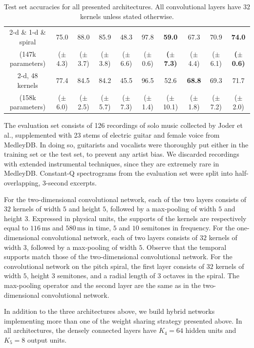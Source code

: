 \documentclass{article}
\makeatletter
\newcommand*{\etal}{et al.\@\xspace}
\newcommand*{\s}[1]{\small{($\pm$ #1)}}
\newcommand*{\g}[1]{\small{\textbf{(}$\boldsymbol{\pm}$ \textbf{#1}\textbf{)}}}
\makeatother
\begin{document}
\begin{table}[t]
\begin{center}
\begin{tabular}{|c|cccccccc|c|}
        \hline
        2-d \& 1-d \& spiral
        & 75.0 & 88.0 & 85.9 & 48.3 & 97.8 & \textbf{59.0} & 67.3 & 70.9 & \textbf{74.0}  \\
        (147k parameters)
        &\s{4.3}&\s{3.7}&\s{3.8}&\s{6.6}&\s{0.6}&\g{7.3}&\s{4.4}&\s{6.1}&\g{0.6}\\
        \hline
        2-d, 48 kernels
        & 77.4 & 84.5 & 84.2 & 45.5 & 96.5 & 52.6 & \textbf{68.8} & 69.3 & 71.7\\
        (158k parameters)
        &\s{6.0}&\s{2.5}&\s{5.7}&\s{7.3}&\s{1.4}&\s{10.1}&\s{1.8}&\s{7.2}&\s{2.0}\\
        \hline
    \end{tabular}
    \end{center}
    \caption{Test set accuracies for all presented architectures. All convolutional layers
    have $32$ kernels unless stated otherwise.
    \label{table:results}}
\end{table}


The evaluation set consists of 126 recordings of solo music collected by
Joder \etal \cite{Joder2009}, supplemented with
23 stems of electric guitar and female voice from MedleyDB.
In doing so, guitarists and vocalists were thoroughly put either in the training set or the test set,
to prevent any artist bias.
We discarded recordings with extended instrumental techniques, since they are
extremely rare in MedleyDB.
Constant-Q spectrograms from the evaluation set were split into half-overlapping,
3-second excerpts.

For the two-dimensional convolutional network, each of the two layers consists of
$32$ kernels of width $5$ and height $5$, followed by a max-pooling of width $5$
and height $3$. Expressed in physical units, the supports of the kernels are respectively equal to $116\,\mathrm{ms}$ and $580\,\mathrm{ms}$ in time, $5$ and $10$ semitones in frequency.
For the one-dimensional convolutional network, each of two layers consists of
$32$ kernels of width $3$, followed by a max-pooling of width $5$. Observe that the temporal
supports match those of the two-dimensional convolutional network.
For the convolutional network on the pitch spiral, the first layer consists of $32$ kernels
of width $5$, height $3$ semitones, and a radial length of $3$ octaves in the spiral.
The max-pooling operator and the second layer are the same as in the two-dimensional convolutional network.

In addition to the three architectures above, we build hybrid networks implementing
more than one of the weight sharing strategy presented above.
In all architectures, the densely connected layers have $K_4=64$ hidden units
and $K_5=8$ output units.
\end{document}
